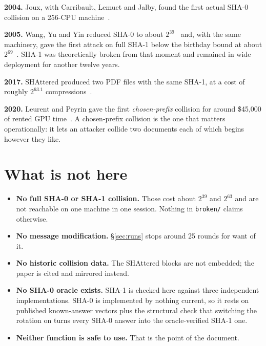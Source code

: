 \documentclass[11pt,a4paper]{article}
\begin{document}
\textbf{2004.} Joux, with Carribault, Lemuet and Jalby, found the first actual
SHA-0 collision on a 256-CPU machine~\cite{joux2004}.

\textbf{2005.} Wang, Yu and Yin reduced SHA-0 to about
$2^{39}$~\cite{wang2005sha0} and, with the same machinery, gave the first
attack on full SHA-1 below the birthday bound at about
$2^{69}$~\cite{wang2005sha1}. SHA-1 was theoretically broken from that moment
and remained in wide deployment for another twelve years.

\textbf{2017.} SHAttered produced two PDF files with the same SHA-1, at a cost
of roughly $2^{63.1}$ compressions~\cite{stevens2017}.

\textbf{2020.} Leurent and Peyrin gave the first \emph{chosen-prefix}
collision for around \$45{,}000 of rented GPU time~\cite{leurent2020}. A
chosen-prefix collision is the one that matters operationally: it lets an
attacker collide two documents each of which begins however they like.

\section{What is not here}\label{sec:limits}

\begin{itemize}[leftmargin=1.4em]
\item \textbf{No full SHA-0 or SHA-1 collision.} Those cost about $2^{39}$ and
      $2^{63}$ and are not reachable on one machine in one session. Nothing in
      \texttt{broken/} claims otherwise.
\item \textbf{No message modification.} \S\ref{sec:runs} stops around 25
      rounds for want of it.
\item \textbf{No historic collision data.} The SHAttered blocks are not
      embedded; the paper is cited and mirrored instead.
\item \textbf{No SHA-0 oracle exists.} SHA-1 is checked here against three
      independent implementations. SHA-0 is implemented by nothing current, so
      it rests on published known-answer vectors plus the structural check
      that switching the rotation on turns every SHA-0 answer into the
      oracle-verified SHA-1 one.
\item \textbf{Neither function is safe to use.} That is the point of the
      document.
\end{itemize}

\printbibliography[heading=bibintoc]
\end{document}
